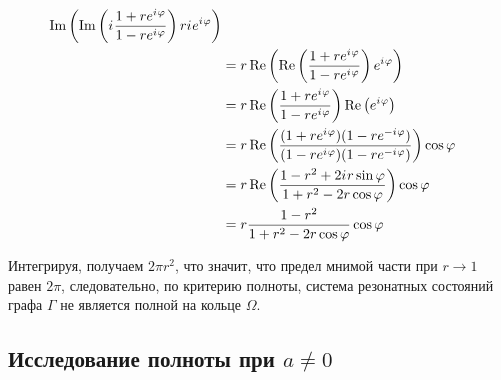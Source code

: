 \begin{align*}
   \operatorname{Im} \left(  \operatorname{Im} \left( {i\mkern1mu} \frac{1 + r e^{{i\mkern1mu} \varphi}}{1 - r e^{{i\mkern1mu} \varphi}} \right) r {i\mkern1mu} e^{{i\mkern1mu} \varphi} \right)
\\ &= r \operatorname{Re} \left(  \operatorname{Re} \left( \frac{1 + r e^{{i\mkern1mu} \varphi}}{1 - r e^{{i\mkern1mu} \varphi}} \right) e^{{i\mkern1mu} \varphi} \right)
\\ &= r \operatorname{Re} \left( \frac{1 + r e^{{i\mkern1mu} \varphi}}{1 - r e^{{i\mkern1mu} \varphi}} \right) \operatorname{Re} \left(   e^{{i\mkern1mu} \varphi} \right)
\\ &= r \operatorname{Re} \left( \frac{(1 + r e^{{i\mkern1mu} \varphi}) (1 - r e^{-{i\mkern1mu} \varphi}) }{(1 - r e^{{i\mkern1mu} \varphi}) (1 - r e^{-{i\mkern1mu} \varphi})} \right) \cos \varphi
\\ &= r \operatorname{Re} \left( \frac{1 - r^2 + 2 {i\mkern1mu} r \sin \varphi}{1 + r^2 - 2 r \cos \varphi} \right) \cos \varphi
\\ &= r \frac{1 - r^2}{1 + r^2 - 2 r \cos \varphi} \cos \varphi 
\end{align*}


Интегрируя, получаем $2 \pi r^2$, что значит, что предел мнимой части при $r \to 1$ равен $2 \pi$, следовательно, по критерию полноты, система резонатных состояний графа $\Gamma$ не является полной на кольце $\Omega$.



\subsection{Исследование полноты при $a \ne 0$}






